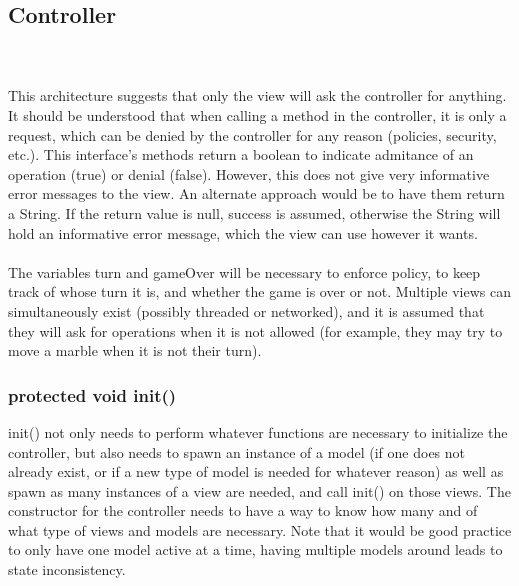 \documentclass{article}
\begin{document}
\subsection{Controller}
\\\\

This architecture suggests that only the view will ask the controller for anything. It should be understood that when calling a method in the controller, it is only a request, which can be denied by the controller for any reason (policies, security, etc.). This interface's methods return a boolean to indicate admitance of an operation (true) or denial (false). However, this does not give very informative error messages to the view. An alternate approach would be to have them return a String. If the return value is null, success is assumed, otherwise the String will hold an informative error message, which the view can use however it wants.\\\\

The variables turn and gameOver will be necessary to enforce policy, to keep track of whose turn it is, and whether the game is over or not. Multiple views can simultaneously exist (possibly threaded or networked), and it is assumed that they will ask for operations when it is not allowed (for example, they may try to move a marble when it is not their turn).

\subsubsection*{protected void init()}
init() not only needs to perform whatever functions are necessary to initialize the controller, but also needs to spawn an instance of a model (if one does not already exist, or if a new type of model is needed for whatever reason) as well as spawn as many instances of a view are needed, and call init() on those views. The constructor for the controller needs to have a way to know how many and of what type of views and models are necessary. Note that it would be good practice to only have one model active at a time, having multiple models around leads to state inconsistency.
\end{document}
